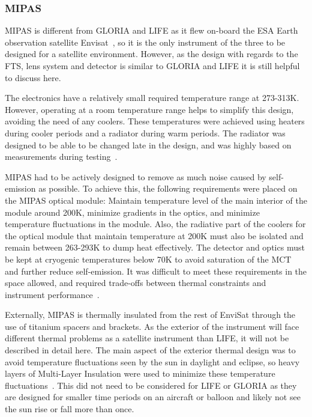 \subsubsection{MIPAS}
MIPAS is different from GLORIA and LIFE as it flew on-board the ESA Earth observation satellite Envisat~\citep{MIPAS_thermal}, so it is the only instrument of the three to be designed for a satellite environment. However, as the design with regards to the FTS, lens system and detector is similar to GLORIA and LIFE it is still helpful to discuss here.

The electronics have a relatively small required temperature range at 273-313K. However, operating at a room temperature range helps to simplify this design, avoiding the need of any coolers. These temperatures were achieved using heaters during cooler periods and a radiator during warm periods. The radiator was designed to be able to be changed late in the design, and was highly based on measurements during testing~\citep{MIPAS_thermal}.

MIPAS had to be actively designed to remove as much noise caused by self-emission as possible. To achieve this, the following requirements were placed on the MIPAS optical module: Maintain temperature level of the main interior of the module around 200K, minimize gradients in the optics, and minimize temperature fluctuations in the module. Also, the radiative part of the coolers for the optical module that maintain temperature at 200K must also be isolated and remain between 263-293K to dump heat effectively. The detector and optics must be kept at cryogenic temperatures below 70K to avoid saturation of the MCT and further reduce self-emission. It was difficult to meet these requirements in the space allowed, and required trade-offs between thermal constraints and instrument performance~\citep{MIPAS_thermal}. 

Externally, MIPAS is thermally insulated from the rest of EnviSat through the use of titanium spacers and brackets. As the exterior of the instrument will face different thermal problems as a satellite instrument than LIFE, it will not be described in detail here. The main aspect of the exterior thermal design was to avoid temperature fluctuations seen by the sun in daylight and eclipse, so heavy layers of Multi-Layer Insulation were used to minimize these temperature fluctuations~\citep{MIPAS_thermal}. This did not need to be considered for LIFE or GLORIA as they are designed for smaller time periods on an aircraft or balloon and likely not see the sun rise or fall more than once. 

